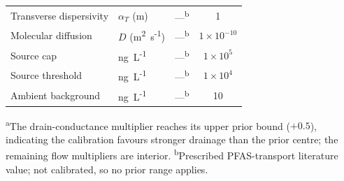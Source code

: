 \begin{table}[t]
\begin{tabular}{@{}llcc@{}}
    Transverse dispersivity         & $\alpha_T$ (m)              & ---\textsuperscript{b} & 1 \\
    Molecular diffusion             & $D$ (m\textsuperscript{2}~s\textsuperscript{-1}) & ---\textsuperscript{b} & $1\times10^{-10}$ \\
    Source cap                      & ng~L\textsuperscript{-1}    & ---\textsuperscript{b} & $1\times10^{5}$ \\
    Source threshold                & ng~L\textsuperscript{-1}    & ---\textsuperscript{b} & $1\times10^{4}$ \\
    Ambient background              & ng~L\textsuperscript{-1}    & ---\textsuperscript{b} & 10 \\
    \bottomrule
  \end{tabular}

  \vspace{2pt}
  \begin{minipage}{\linewidth}\footnotesize
  \textsuperscript{a}The drain-conductance multiplier reaches its upper prior
  bound ($+0.5$), indicating the calibration favours stronger drainage than the
  prior centre; the remaining flow multipliers are interior.\quad
  \textsuperscript{b}Prescribed PFAS-transport literature value; not calibrated,
  so no prior range applies.
  \end{minipage}
\end{table}

